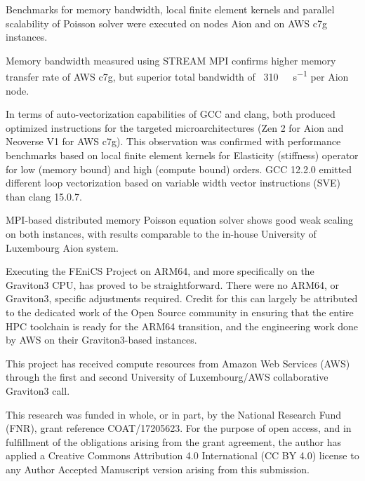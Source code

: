 Benchmarks for memory bandwidth, local finite element kernels and parallel
scalability of Poisson solver were executed on nodes Aion and on AWS c7g
instances.

Memory bandwidth measured using STREAM MPI confirms higher memory transfer rate
of AWS c7g, but superior total bandwidth of ~\SI{310}{\giga\byte\per\second} per
Aion node.

In terms of auto-vectorization capabilities of GCC and clang, both produced
optimized instructions for the targeted microarchitectures (Zen 2 for Aion and
Neoverse V1 for AWS c7g). This observation was confirmed with performance
benchmarks based on local finite element kernels for Elasticity (stiffness)
operator for low (memory bound) and high (compute bound) orders. GCC 12.2.0
emitted different loop vectorization based on variable width vector instructions
(SVE) than clang 15.0.7.

MPI-based distributed memory Poisson equation solver shows good weak scaling on
both instances, with results comparable to the in-house University of Luxembourg
Aion system.

Executing the FEniCS Project on ARM64, and more specifically on the Graviton3
CPU, has proved to be straightforward. There were no ARM64, or Graviton3,
specific adjustments required. Credit for this can largely be attributed to the
dedicated work of the Open Source community in ensuring that the entire HPC
toolchain is ready for the ARM64 transition, and the engineering work done by
AWS on their Graviton3-based instances.


\begin{acknowledgement}
This project has received compute resources from Amazon Web Services (AWS)
through the first and second University of Luxembourg/AWS collaborative
Graviton3 call.

This research was funded in whole, or in part, by the National Research Fund
(FNR), grant reference COAT/17205623. For the purpose of open access, and in
fulfillment of the obligations arising from the grant agreement, the author has
applied a Creative Commons Attribution 4.0 International (CC BY 4.0) license to
any Author Accepted Manuscript version arising from this submission.
\end{acknowledgement}






